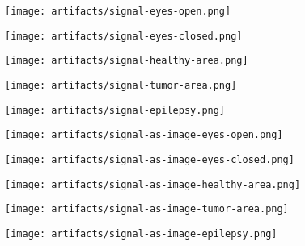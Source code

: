 \documentclass[conference]{IEEEtran}
\begin{document}
\begin{figure*}[!t]
	\centering
	\begin{subfigure}{0.19\linewidth}
		\centering
		\texttt{[image: artifacts/signal-eyes-open.png]}
	\end{subfigure}
	\begin{subfigure}{0.19\linewidth}
		\centering
		\texttt{[image: artifacts/signal-eyes-closed.png]}
	\end{subfigure}
	\begin{subfigure}{0.19\linewidth}
		\centering
		\texttt{[image: artifacts/signal-healthy-area.png]}
	\end{subfigure}
	\begin{subfigure}{0.19\linewidth}
		\centering
		\texttt{[image: artifacts/signal-tumor-area.png]}
	\end{subfigure}
	\begin{subfigure}{0.19\linewidth}
		\centering
		\texttt{[image: artifacts/signal-epilepsy.png]}
	\end{subfigure}

	\begin{subfigure}{0.19\linewidth}
		\centering
		\texttt{[image: artifacts/signal-as-image-eyes-open.png]}
	\end{subfigure}
	\begin{subfigure}{0.19\linewidth}
		\centering
		\texttt{[image: artifacts/signal-as-image-eyes-closed.png]}
	\end{subfigure}
	\begin{subfigure}{0.19\linewidth}
		\centering
		\texttt{[image: artifacts/signal-as-image-healthy-area.png]}
	\end{subfigure}
	\begin{subfigure}{0.19\linewidth}
		\centering
		\texttt{[image: artifacts/signal-as-image-tumor-area.png]}
	\end{subfigure}
	\begin{subfigure}{0.19\linewidth}
		\centering
		\texttt{[image: artifacts/signal-as-image-epilepsy.png]}
	\end{subfigure}


\end{figure*}
\end{document}
